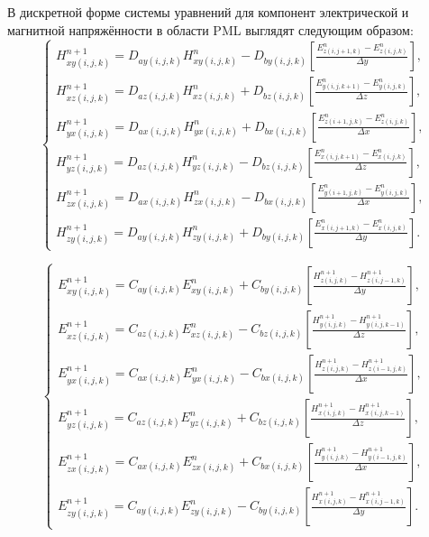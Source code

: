 В дискретной форме системы уравнений для компонент электрической и магнитной напряжённости в области PML выглядят следующим образом:
\begin{equation}
\label{eq:PmlFormulas1}
\left\{
\begin{aligned}
H_{xy (i,j,k)}^{n+1} = D_{ay (i,j,k)} H_{xy (i,j,k)}^{n} - D_{by (i,j,k)}
\left[
    \frac{E_{z (i,j+1,k)}^n - E_{z (i,j,k)}^n}{\Delta y}
\right], \\
H_{xz (i,j,k)}^{n+1} = D_{az (i,j,k)} H_{xz (i,j,k)}^{n} + D_{bz (i,j,k)}
\left[
    \frac{E_{y (i,j,k+1)}^n - E_{y (i,j,k)}^n}{\Delta z}
\right], \\
H_{yx (i,j,k)}^{n+1} = D_{ax (i,j,k)} H_{yx (i,j,k)}^{n} + D_{bx (i,j,k)}
\left[
    \frac{E_{z (i+1,j,k)}^n - E_{z (i,j,k)}^n}{\Delta x}
\right], \\
H_{yz (i,j,k)}^{n+1} = D_{az (i,j,k)} H_{yz (i,j,k)}^{n} - D_{bz (i,j,k)}
\left[
    \frac{E_{x (i,j,k+1)}^n - E_{x (i,j,k)}^n}{\Delta z}
\right], \\
H_{zx (i,j,k)}^{n+1} = D_{ax (i,j,k)} H_{zx (i,j,k)}^{n} - D_{bx (i,j,k)}
\left[
    \frac{E_{y (i+1,j,k)}^n - E_{y (i,j,k)}^n}{\Delta x}
\right], \\
H_{zy (i,j,k)}^{n+1} = D_{ay (i,j,k)} H_{zy (i,j,k)}^{n} + D_{by (i,j,k)}
\left[
    \frac{E_{x (i,j+1,k)}^n - E_{x (i,j,k)}^n}{\Delta y}
\right].
\end{aligned}
\right.
\end{equation}

\begin{equation}
\label{eq:PmlFormulas2}
\left\{
\begin{aligned}
E_{xy (i,j,k)}^{n+1} = C_{ay (i,j,k)} E_{xy (i,j,k)}^{n} + C_{by (i,j,k)}
\left[
    \frac{H_{z (i,j,k)}^{n+1} - H_{z (i,j-1,k)}^{n+1}}{\Delta y}
\right], \\
E_{xz (i,j,k)}^{n+1} = C_{az (i,j,k)} E_{xz (i,j,k)}^{n} - C_{bz (i,j,k)}
\left[
    \frac{H_{y (i,j,k)}^{n+1} - H_{y (i,j,k-1)}^{n+1}}{\Delta z}
\right], \\
E_{yx (i,j,k)}^{n+1} = C_{ax (i,j,k)} E_{yx (i,j,k)}^{n} - C_{bx (i,j,k)}
\left[
    \frac{H_{z (i,j,k)}^{n+1} - H_{z (i-1,j,k)}^{n+1}}{\Delta x}
\right], \\
E_{yz (i,j,k)}^{n+1} = C_{az (i,j,k)} E_{yz (i,j,k)}^{n} + C_{bz (i,j,k)}
\left[
    \frac{H_{x (i,j,k)}^{n+1} - H_{x (i,j,k-1)}^{n+1}}{\Delta z}
\right], \\
E_{zx (i,j,k)}^{n+1} = C_{ax (i,j,k)} E_{zx (i,j,k)}^{n} + C_{bx (i,j,k)}
\left[
    \frac{H_{y (i,j,k)}^{n+1} - H_{y (i-1,j,k)}^{n+1}}{\Delta x}
\right], \\
E_{zy (i,j,k)}^{n+1} = C_{ay (i,j,k)} E_{zy (i,j,k)}^{n} - C_{by (i,j,k)}
\left[
    \frac{H_{x (i,j,k)}^{n+1} - H_{x (i,j-1,k)}^{n+1}}{\Delta y}
\right].
\end{aligned}
\right.
\end{equation}

